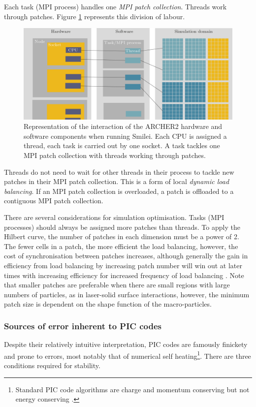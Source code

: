 Each task (MPI process) handles one \textit{MPI patch collection}. Threads work through patches. Figure \ref{fig:introsmileiparallelisationcomplex} represents this division of labour.
\begin{figure}
	\centering
	\includegraphics[width=1\linewidth]{figures/intro/intro_smilei_parallelisation_complex}
	\caption[Representation of the interaction of the ARCHER2 hardware and software components when running Smilei.]{Representation of the interaction of the ARCHER2 hardware and software components when running Smilei. Each CPU is assigned a thread, each task is carried out by one socket. A task tackles one MPI patch collection with threads working through patches.}
	\label{fig:introsmileiparallelisationcomplex}
\end{figure}
Threads do not need to wait for other threads in their process to tackle new patches in their MPI patch collection. This is a form of local \textit{dynamic load balancing}. If an MPI patch collection is overloaded, a patch is offloaded to a contiguous MPI patch collection.

There are several considerations for simulation optimisation. Tasks (MPI processes) should always be assigned more patches than threads. To apply the Hilbert curve, the number of patches in each dimension must be a power of 2. The fewer cells in a patch, the more efficient the load balancing, however, the cost of synchronisation between patches increases, although generally the gain in efficiency from load balancing by increasing patch number will win out at later times with increasing efficiency for increased frequency of load balancing \cite{derouillatSmileiCollaborativeOpensource2018}. Note that smaller patches are preferable when there are small regions with large numbers of particles, as in laser-solid surface interactions, however, the minimum patch size is dependent on the shape function of the macro-particles.

\subsubsection{Sources of error inherent to PIC codes}
Despite their relatively intuitive interpretation, PIC codes are famously finickety and prone to errors, most notably that of numerical self heating\footnote{Standard PIC code algorithms are charge and momentum conserving but not energy conserving \cite{derouillatSmileiCollaborativeOpensource2018}.}. There are three conditions required for stability.

